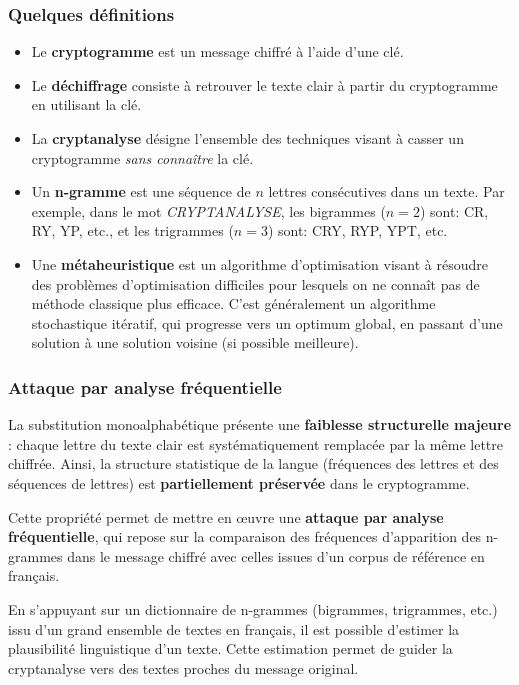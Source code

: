\documentclass[a4paper]{article}
\begin{document}
\subsubsection{Quelques définitions}

\begin{itemize}
    \item Le \textbf{cryptogramme} est un message chiffré à l'aide d'une clé.
    \item Le \textbf{déchiffrage} consiste à retrouver le texte clair à partir du cryptogramme en utilisant la clé.
    \item La \textbf{cryptanalyse} désigne l’ensemble des techniques visant à casser un cryptogramme \textit{sans connaître} la clé.
    \item Un \textbf{n-gramme} est une séquence de $n$ lettres consécutives dans un texte. Par exemple, dans le mot \textit{CRYPTANALYSE}, les bigrammes ($n = 2$) sont: CR, RY, YP, etc., et les trigrammes ($n = 3$) sont: CRY, RYP, YPT, etc.
    \item Une \textbf{métaheuristique} est un algorithme d’optimisation visant à résoudre des problèmes d’optimisation difficiles pour lesquels on ne connaît pas de méthode classique plus efficace. C'est généralement un algorithme stochastique itératif, qui
    progresse vers un optimum global, en passant d'une solution à une solution voisine (si possible meilleure).
\end{itemize}

\subsubsection{Attaque par analyse fréquentielle}

La substitution monoalphabétique présente une \textbf{faiblesse structurelle majeure} : chaque lettre du texte clair est systématiquement remplacée par la même lettre chiffrée. Ainsi, la structure statistique de la langue (fréquences des lettres et des séquences de lettres) est \textbf{partiellement préservée} dans le cryptogramme.

Cette propriété permet de mettre en œuvre une \textbf{attaque par analyse fréquentielle}, qui repose sur la comparaison des fréquences d’apparition des n-grammes dans le message chiffré avec celles issues d’un corpus de référence en français.

En s’appuyant sur un dictionnaire de n-grammes (bigrammes, trigrammes, etc.) issu d’un grand ensemble de textes en français, il est possible d’estimer la plausibilité linguistique d’un texte. Cette estimation permet de guider la cryptanalyse vers des textes proches du message original.
\end{document}
